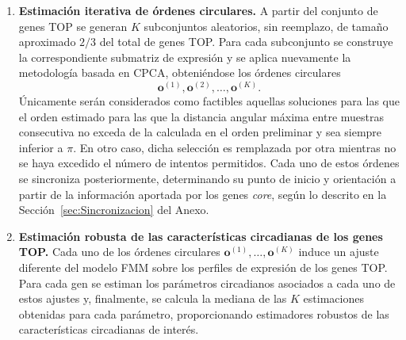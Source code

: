 \documentclass[12pt, a4paper]{report}
\begin{document}
\begin{enumerate}
A partir de dichos parámetros  se retiene una fracción prefijada del total de genes de la matriz, denominada conjunto TOP y denotado por \(\mathcal{T}\subseteq\{1,\ldots,G\}\), correspondiente a aquellos con mayor \(R^2_{\mathrm{FMM}}\), perfiles no \textit{spiked} (\(\omega>0{,}1\)) y cuyos instantes de máxima expresión (\(t_U\)) cubren de forma aproximadamente uniforme la circunferencia unidad. Con independencia de estos criterios, los genes \textit{core} se incorporan siempre al conjunto TOP.

%
%
%
%
%

\item \textbf{Estimación iterativa de órdenes circulares.} A partir del conjunto de genes TOP se generan \(K\) subconjuntos aleatorios, sin reemplazo, de tamaño aproximado \(2/3\) del total de genes TOP. Para cada subconjunto se construye la correspondiente submatriz de expresión y se aplica nuevamente la metodología basada en CPCA, obteniéndose los órdenes circulares
\[
\mathbf{o}^{(1)},\mathbf{o}^{(2)},\ldots,\mathbf{o}^{(K)}.
\]
Únicamente serán considerados como factibles aquellas soluciones para las que el orden estimado para las que la distancia angular máxima entre muestras consecutiva no exceda de la calculada en el orden preliminar y sea siempre inferior a \(\pi\). En otro caso, dicha selección es remplazada por otra mientras no se haya excedido el número de intentos permitidos.
Cada uno de estos órdenes se sincroniza posteriormente, determinando su punto de inicio y  orientación a partir de la información aportada por los genes \textit{core}, según lo descrito en la Sección~\ref{sec:Sincronizacion} del Anexo.
\item \textbf{Estimación robusta de las características circadianas de los genes TOP.} Cada uno de los órdenes circulares \(\mathbf{o}^{(1)},\ldots,\mathbf{o}^{(K)}\) induce un ajuste diferente del modelo FMM sobre los perfiles de expresión de los genes TOP. Para cada gen se estiman los parámetros circadianos asociados a cada uno de estos ajustes y, finalmente, se calcula la mediana de las \(K\) estimaciones obtenidas para cada parámetro, proporcionando estimadores robustos de las características circadianas de interés.
\end{enumerate}
\end{document}

